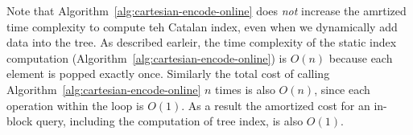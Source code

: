 Note that Algorithm~\ref{alg:cartesian-encode-online} does {\em not}
increase the amrtized time complexity to compute teh Catalan index,
even when we dynamically add data into the tree.  As described
earleir, the time complexity of the static index computation
(Algorithm~\ref{alg:cartesian-encode-online}) is $O(n)$ because each
element is popped exactly once.  Similarly the total cost of calling
Algorithm~\ref{alg:cartesian-encode-online} $n$ times is also $O(n)$,
since each operation within the loop is $O(1)$.  As a result the
amortized cost for an in-block query, including the computation of
tree index, is also $O(1)$.

\iffalse
最後，我們不改變原本的建立笛卡爾樹算法，便能在過程中擭得樹的編號，
每一次的 in-block 詢問只需要一次記憶體存取，得到任一操作攤銷複雜度 $\theta(1)$。
\fi
